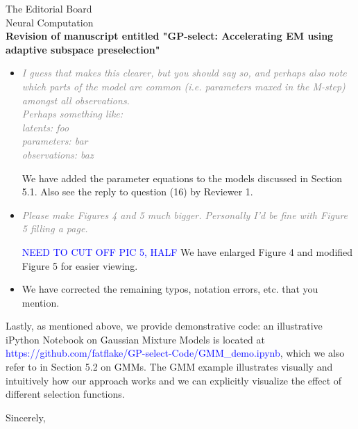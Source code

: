 \documentclass[10pt]{letter}
\newcommand{\rvr}[1]{\textcolor{gray}{#1}}
\newcommand{\rev}[1]{\textcolor{blue}{#1}}
\begin{document}
\begin{letter}{
The Editorial Board\\
Neural Computation\\
\vspace{10mm}
\textbf{Revision of manuscript entitled "GP-select: Accelerating EM using adaptive
subspace preselection"}
}
\begin{itemize}[topsep=3pt,itemsep=2ex,partopsep=1ex,parsep=1ex]
    \item \rvr{\emph{I guess that makes this clearer, but you should say so, and perhaps also note which parts of the model are common (i.e. parameters maxed in the M-step) amongst all observations.  \\
Perhaps something like:\\
latents: foo \\
parameters: bar\\
observations: baz}}

    We have added the parameter equations to the models discussed in Section 5.1. Also see the reply to question (16) by Reviewer 1.


    \item \rvr{\emph{Please make Figures 4 and 5 much bigger. Personally I'd be fine with Figure 5 filling a page.}}

        \rev{NEED TO CUT OFF PIC 5, HALF}
        We have enlarged Figure 4 and modified Figure 5 for easier viewing.

    \item We have corrected the remaining typos, notation errors, etc. that you mention.
    



\end{itemize}

Lastly, as mentioned above, we provide demonstrative code: an illustrative iPython Notebook on Gaussian Mixture Models is located at \rev{https://github.com/fatflake/GP-select-Code/GMM\_demo.ipynb}, which we also refer to in Section 5.2 on GMMs. The GMM example illustrates visually and intuitively how our approach works and we can explicitly visualize the effect of different selection functions. 

\noindent \vspace{.1in}\closing{Sincerely,\vspace{-5mm}}

\end{letter}
\end{document}
